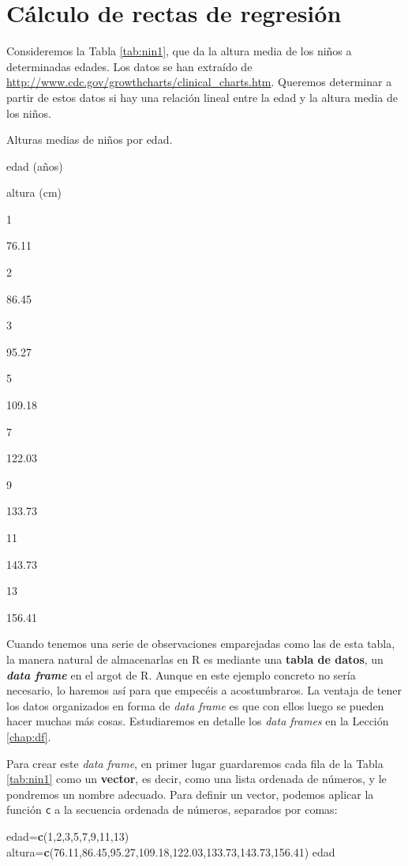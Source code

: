 \documentclass[]{book}
\newenvironment{Shaded}{\begin{snugshade}}{\end{snugshade}}
\newcommand{\DecValTok}[1]{\textcolor[rgb]{0.00,0.00,0.81}{#1}}
\newcommand{\FloatTok}[1]{\textcolor[rgb]{0.00,0.00,0.81}{#1}}
\newcommand{\KeywordTok}[1]{\textcolor[rgb]{0.13,0.29,0.53}{\textbf{#1}}}
\newcommand{\NormalTok}[1]{#1}
\theoremstyle{definition}
\theoremstyle{definition}
\theoremstyle{definition}
\theoremstyle{remark}
\begin{document}
\hypertarget{sec:introlm}{%
\section{Cálculo de rectas de regresión}\label{sec:introlm}}

Consideremos la Tabla \ref{tab:nin1}, que da la altura media de los niños a determinadas edades. Los datos se han extraído de \url{http://www.cdc.gov/growthcharts/clinical_charts.htm}. Queremos determinar a partir de estos datos si hay una relación lineal entre la edad y la altura media de los niños.

\label{tab:nin1}Alturas medias de niños por edad.

edad (años)

altura (cm)

1

76.11

2

86.45

3

95.27

5

109.18

7

122.03

9

133.73

11

143.73

13

156.41

Cuando tenemos una serie de observaciones emparejadas como las de esta tabla, la manera natural de almacenarlas en R es mediante una \textbf{tabla de datos}, un \textbf{\emph{data frame}} en el argot de R. Aunque en este ejemplo concreto no sería necesario, lo haremos así para que empecéis a acostumbraros. La ventaja de tener los datos organizados en forma de \emph{data frame} es que con ellos luego se pueden hacer muchas más cosas. Estudiaremos en detalle los \emph{data frames} en la Lección \ref{chap:df}.

Para crear este \emph{data frame}, en primer lugar guardaremos cada fila de la Tabla \ref{tab:nin1} como un \textbf{vector}, es decir, como una lista ordenada de números, y le pondremos un nombre adecuado. Para definir un vector, podemos aplicar la función \texttt{c} a la secuencia ordenada de números, separados por comas:

\begin{Shaded}
\begin{Highlighting}[]
\NormalTok{edad=}\KeywordTok{c}\NormalTok{(}\DecValTok{1}\NormalTok{,}\DecValTok{2}\NormalTok{,}\DecValTok{3}\NormalTok{,}\DecValTok{5}\NormalTok{,}\DecValTok{7}\NormalTok{,}\DecValTok{9}\NormalTok{,}\DecValTok{11}\NormalTok{,}\DecValTok{13}\NormalTok{)}
\NormalTok{altura=}\KeywordTok{c}\NormalTok{(}\FloatTok{76.11}\NormalTok{,}\FloatTok{86.45}\NormalTok{,}\FloatTok{95.27}\NormalTok{,}\FloatTok{109.18}\NormalTok{,}\FloatTok{122.03}\NormalTok{,}\FloatTok{133.73}\NormalTok{,}\FloatTok{143.73}\NormalTok{,}\FloatTok{156.41}\NormalTok{)}
\NormalTok{edad}
\end{Highlighting}
\end{Shaded}
\end{document}
